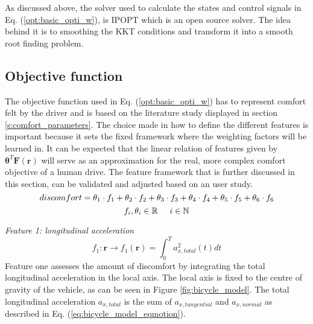 As discussed above, the solver used to calculate the states and control signals in Eq. (\ref{opt:basic_opti_w}), is IPOPT which is an open source solver. The idea behind it is to smoothing the KKT conditions and transform it into a smooth root finding problem. \cite{Panos_opti} \\


\subsection{Objective function}\label{s:obj}
The objective function used in Eq. (\ref{opt:basic_opti_w}) has to represent comfort felt by the driver and is based on the literature study displayed in section \ref{s:comfort_parameters}. The choice made in how to define the different features is important because it sets the fixed framework where the weighting factors will be learned in. It can be expected that the linear relation of features given by $\bm{\theta}^T\bm{F}(\bm{r})$ will serve as an approximation for the real, more complex comfort objective of a human drive. The feature framework that is further discussed in this section, can be validated and adjusted based on an user study.\\


\begin{equation}\label{eq:obj}
discomfort = \theta_1 \cdot f_1 +\theta_2 \cdot f_2 +\theta_3 \cdot f_3 +\theta_4 \cdot f_4 +\theta_5 \cdot f_5 +\theta_6 \cdot f_6 \\
\end{equation}
\[	f_i, \theta_i \in \mathbb{R} \hspace{5mm}
i \in \mathbb{N}\]


\textit{Feature 1: longitudinal acceleration}
\begin{equation}\label{eq:flong_acc}
f_{1}:\bm{r}\xrightarrow{}f_1(\bm{r})=\int_{0}^{T}a_{x,total}^{2}(t) dt
\end{equation}
Feature one assesses the amount of discomfort by integrating the total longitudinal acceleration in the local axis. The local axis is fixed to the centre of gravity of the vehicle, as can be seen in Figure \ref{fig:bicycle_model}. The total longitudinal acceleration  $a_{x,total} $ is the sum of  $ a_{x,tangential}$ and $a_{x,normal}$ as described in Eq. (\ref{eq:bicycle_model_eqmotion}). \\

